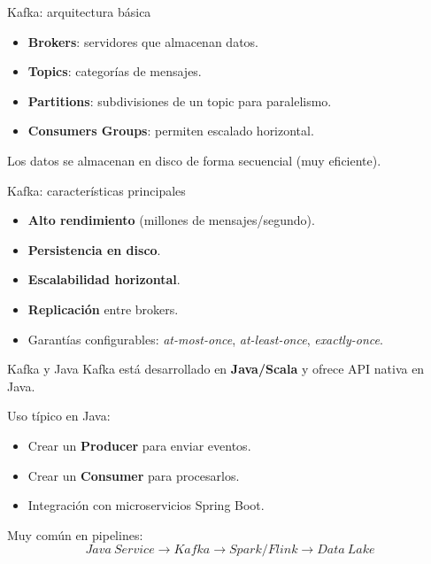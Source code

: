 \documentclass{beamer}
\begin{document}
\begin{frame}{Kafka: arquitectura básica}
\begin{itemize}
    \item \textbf{Brokers}: servidores que almacenan datos.
    \item \textbf{Topics}: categorías de mensajes.
    \item \textbf{Partitions}: subdivisiones de un topic para paralelismo.
    \item \textbf{Consumers Groups}: permiten escalado horizontal.
\end{itemize}

\medskip
Los datos se almacenan en disco de forma secuencial (muy eficiente).
\end{frame}

\begin{frame}{Kafka: características principales}
\begin{itemize}
    \item \textbf{Alto rendimiento} (millones de mensajes/segundo).
    \item \textbf{Persistencia en disco}.
    \item \textbf{Escalabilidad horizontal}.
    \item \textbf{Replicación} entre brokers.
    \item Garantías configurables: \textit{at-most-once}, \textit{at-least-once}, \textit{exactly-once}.
\end{itemize}
\end{frame}

\begin{frame}{Kafka y Java}
Kafka está desarrollado en \textbf{Java/Scala} y ofrece API nativa en Java.

Uso típico en Java:
\begin{itemize}
    \item Crear un \textbf{Producer} para enviar eventos.
    \item Crear un \textbf{Consumer} para procesarlos.
    \item Integración con microservicios Spring Boot.
\end{itemize}

\medskip
Muy común en pipelines:
\[
Java\ Service \rightarrow Kafka \rightarrow Spark/Flink \rightarrow Data\ Lake
\]
\end{frame}
\end{document}
